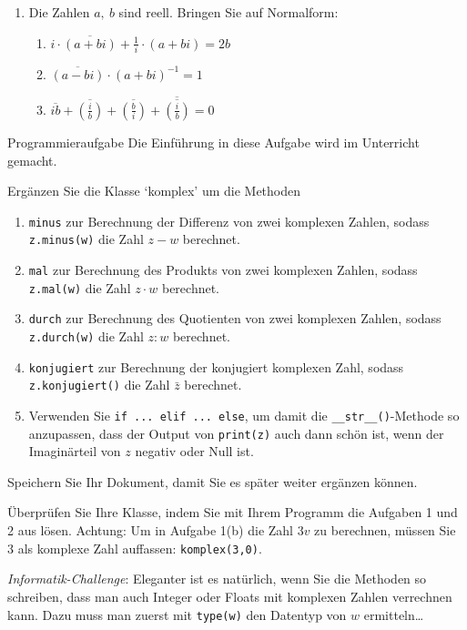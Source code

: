 \begin{enumerate}
    \item Die Zahlen $a,\ b$ sind reell. Bringen Sie auf Normalform:
    \begin{enumerate}
        \item $i\cdot \overline{(a+bi)}+\frac{1}{i}\cdot (a+bi)= 2b$
        \item $\overline{(a-bi)}\cdot (a+bi)^{-1}= 1$
        \item $\overline{ib}+\overline{\left(\frac{i}{b}\right)}+\overline{\left(\frac{b}{i}\right)}+\overline{\overline{\left(\frac{i}{b}\right)}}= 0$
    \end{enumerate}
\end{enumerate}

\clearpage
\begin{ueb}
{Programmieraufgabe}{}
Die Einführung in diese Aufgabe wird im Unterricht gemacht.

Ergänzen Sie die Klasse `komplex' um die Methoden
\begin{enumerate}
    \item \lstinline{minus} zur Berechnung der Differenz von zwei komplexen Zahlen, sodass \lstinline{z.minus(w)} die Zahl $z-w$ berechnet.
    \item \lstinline{mal} zur Berechnung des Produkts von zwei komplexen Zahlen, sodass \lstinline{z.mal(w)} die Zahl $z\cdot w$ berechnet.
    \item \lstinline{durch} zur Berechnung des Quotienten von zwei komplexen Zahlen, sodass \lstinline{z.durch(w)} die Zahl $z : w$ berechnet.
    \item \lstinline{konjugiert} zur Berechnung der konjugiert komplexen Zahl, sodass \lstinline{z.konjugiert()} die Zahl $\bar{z}$ berechnet.
    \item Verwenden Sie \lstinline{if ... elif ... else}, um damit die \lstinline{__str__()}-Methode so anzupassen, dass der Output von \lstinline{print(z)} auch dann schön ist, wenn der Imaginärteil von $z$ negativ oder Null ist.
\end{enumerate}

Speichern Sie Ihr Dokument, damit Sie es später weiter ergänzen können.

\bigskip

Überprüfen Sie Ihre Klasse, indem Sie mit Ihrem Programm die Aufgaben 1 und 2 aus  lösen. Achtung: Um in Aufgabe 1(b) die Zahl $3v$ zu berechnen, müssen Sie $3$ als komplexe Zahl auffassen: \lstinline{komplex(3,0)}. 

\bigskip

\emph{Informatik-Challenge}: Eleganter ist es natürlich, wenn Sie die Methoden so schreiben, dass man auch Integer oder Floats mit komplexen Zahlen verrechnen kann. Dazu muss man zuerst mit \lstinline{type(w)} den Datentyp von $w$ ermitteln\dots

\end{ueb}

